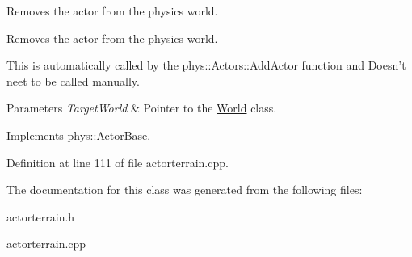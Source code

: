 Removes the actor from the physics world. 

Removes the actor from the physics world. \par
 This is automatically called by the phys::Actors::AddActor function and Doesn't neet to be called manually. 
\begin{DoxyParams}{Parameters}
{\em TargetWorld} & Pointer to the \hyperlink{classphys_1_1World}{World} class. \\
\hline
\end{DoxyParams}


Implements \hyperlink{classphys_1_1ActorBase_aaa787de7ec5d7d1d8428ea78f37bcb40}{phys::ActorBase}.



Definition at line 111 of file actorterrain.cpp.



The documentation for this class was generated from the following files:\begin{DoxyCompactItemize}
\item 
actorterrain.h\item 
actorterrain.cpp\end{DoxyCompactItemize}
